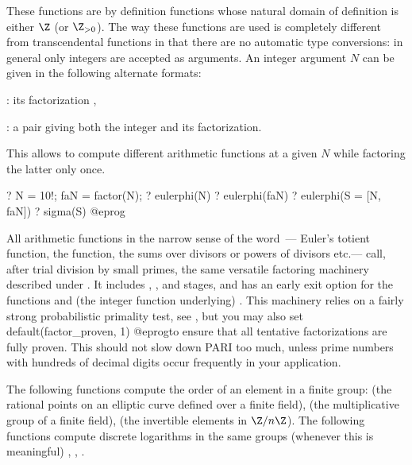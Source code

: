 These functions are by definition functions whose natural domain of
definition is either $\Z$ (or $\Z_{>0}$). The way these functions are used is
completely different from transcendental functions in that there are no
automatic type conversions: in general only integers are accepted as
arguments. An integer argument $N$ can be given in the following alternate
formats:

\item {}: its factorization ,

\item {}: a pair \kbd{[$N$, fa]} giving both the integer and
  its factorization.

This allows to compute different arithmetic functions at a given $N$
while factoring the latter only once.

\bprog
  ? N = 10!; faN = factor(N);
  ? eulerphi(N)
  ? eulerphi(faN)
  ? eulerphi(S = [N, faN])
  ? sigma(S)
@eprog

All arithmetic functions in the narrow sense of the word~--- Euler's
totient function, the  function,
the sums over divisors or powers of divisors etc.--- call, after trial
division by small primes, the same versatile factoring machinery described
under . It includes , ,
 and  stages, and has an early exit option for the
functions  and (the integer function underlying)
. This machinery relies on a fairly strong
probabilistic primality test, see , but you may also set
\bprog
  default(factor_proven, 1)
@eprog\noindent to ensure that all tentative factorizations are fully proven.
This should not slow down PARI too much, unless prime numbers with
hundreds of decimal digits occur frequently in your application.

\label{se:DLfun}

The following functions compute the order of an element in a finite group:
 (the rational points on an elliptic curve defined over a
finite field),  (the multiplicative group of a finite field),
 (the invertible elements in $\Z/n\Z$). The following functions
compute discrete logarithms in the same groups (whenever this is meaningful)
, , .

